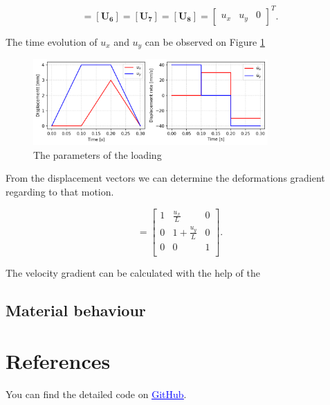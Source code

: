 \documentclass[12pt,a4paper]{article}
\begin{document}
\begin{equation}
    [\boldsymbol{U_5}] = [\boldsymbol{U_6}] = [\boldsymbol{U_7}] = [\boldsymbol{U_8}] = \begin{bmatrix} u_x & u_y & 0 \end{bmatrix}^T.
\end{equation}

The time evolution of $u_x$ and $u_y$ can be observed on Figure \ref{fig:displacements}

\begin{figure}[h]
    \centering
    \includegraphics[width=0.8\textwidth]{figures/loading.png}
    \caption{The parameters of the loading}
    \label{fig:displacements}
\end{figure}

From the displacement vectors we can determine the deformations gradient regarding to that motion.

\begin{equation}
    [F] = 
        \begin{bmatrix}
            1 & \frac{u_x}{L} & 0 \\
            0 & 1+\frac{u_y}{L} & 0 \\
            0 & 0 & 1 \\
        \end{bmatrix}.
\end{equation}


The velocity gradient can be calculated with the help of the 

\newpage

\subsection*{Material behaviour}

\newpage


\section*{References}

You can find the detailed code on \href{https://github.com/zsoca000/Finite-elastic-deformations-HW1/blob/main/solution2.ipynb}{\textcolor{blue}{\underline{GitHub}}}.
\end{document}
